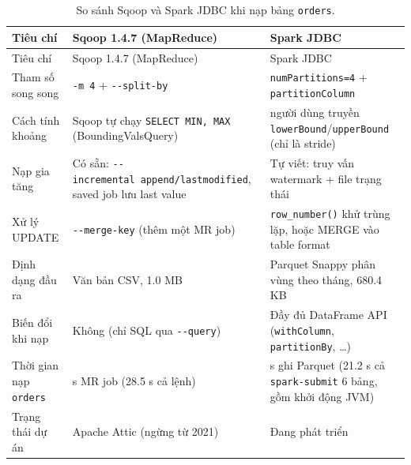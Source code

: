 \documentclass[
  12pt,
  a4paper,
]{report}
\begin{document}
\begin{longtable}[]{@{}
  >{\raggedright\arraybackslash}p{}
  >{\raggedright\arraybackslash}p{}
  >{\raggedright\arraybackslash}p{}@{}}
\caption{\label{tbl:l04-compare}So sánh Sqoop và Spark JDBC khi nạp bảng
\texttt{orders}.}\tabularnewline
\toprule\noalign{}
\begin{minipage}[b]{\linewidth}\raggedright
Tiêu chí
\end{minipage} & \begin{minipage}[b]{\linewidth}\raggedright
Sqoop 1.4.7 (MapReduce)
\end{minipage} & \begin{minipage}[b]{\linewidth}\raggedright
Spark JDBC
\end{minipage} \\
\midrule\noalign{}
\endfirsthead
\toprule\noalign{}
\begin{minipage}[b]{\linewidth}\raggedright
Tiêu chí
\end{minipage} & \begin{minipage}[b]{\linewidth}\raggedright
Sqoop 1.4.7 (MapReduce)
\end{minipage} & \begin{minipage}[b]{\linewidth}\raggedright
Spark JDBC
\end{minipage} \\
\midrule\noalign{}
\endhead
\bottomrule\noalign{}
\endlastfoot
Tham số song song & \texttt{-m\ 4} + \texttt{-\/-split-by} &
\texttt{numPartitions=4} + \texttt{partitionColumn} \\
Cách tính khoảng & Sqoop tự chạy \texttt{SELECT\ MIN,\ MAX}
(BoundingValsQuery) & người dùng truyền
\texttt{lowerBound}/\texttt{upperBound} (chỉ là stride) \\
Nạp gia tăng & Có sẵn:
\texttt{-\/-incremental\ append/}\allowbreak{}\texttt{lastmodified}\allowbreak{},
saved job lưu last value & Tự viết: truy vấn watermark + file trạng
thái \\
Xử lý UPDATE & \texttt{-\/-merge-key} (thêm một MR job) &
\texttt{row\_number()} khử trùng lặp, hoặc MERGE vào table format \\
Định dạng đầu ra & Văn bản CSV, 1.0 MB & Parquet Snappy phân vùng theo
tháng, 680.4 KB \\
Biến đổi khi nạp & Không (chỉ SQL qua \texttt{-\/-query}) & Đầy đủ
DataFrame API (\texttt{withColumn}, \texttt{partitionBy}, \ldots) \\
Thời gian nạp \texttt{orders} & 25.2 s MR job (28.5 s cả lệnh) & 3.10 s
ghi Parquet (21.2 s cả \texttt{spark-submit} 6 bảng, gồm khởi động
JVM) \\
Trạng thái dự án & Apache Attic (ngừng từ 2021) & Đang phát triển \\
\end{longtable}
\end{document}
